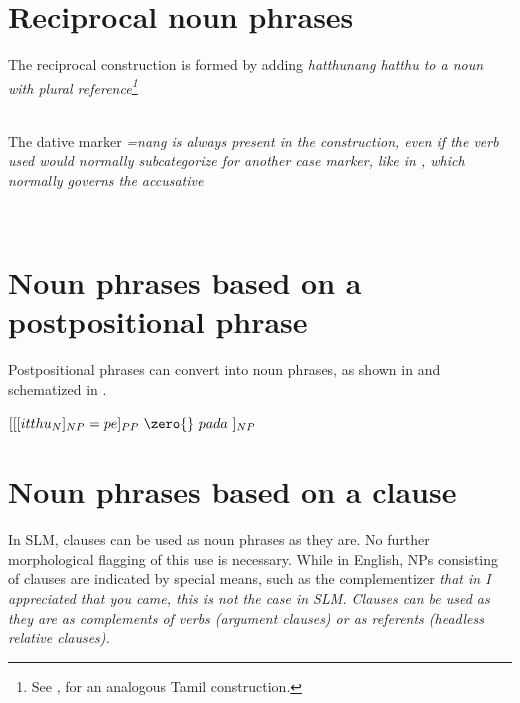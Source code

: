 \section{Reciprocal noun phrases}\label{sec:nppp:Reciprocalnounphrases}
The reciprocal construction is formed by adding \em hatthunang hatthu \em to a noun with plural reference\footnote{See \citet[177]{Beythan1943}, \citet[11]{Malten1989} for an analogous Tamil construction.}

 \\
The dative marker \em =nang \em is always present in the construction, even if the verb used would normally subcategorize for another case marker, like  in , which normally governs the accusative

 \\

\section{Noun phrases based on a postpositional phrase}\label{sec:nppp:Nounphrasesbasedonapostpositionalphrase}
Postpositional phrases can convert into noun phrases, as shown in  and schematized in .


\ea\label{ex:constr:NP:PP:schema}
$
[
	[
		[itthu_{N}]_{NP}
	=pe]_{PP}
~\zero{}~ pada~]_{NP}
$
\z


\section{Noun phrases based on a clause}\label{sec:nppp:Nounphrasesbasedonaclause}
In SLM, clauses can be used as noun phrases as they are. No further morphological flagging of this use is necessary. While in English, NPs consisting of clauses are indicated by special means, such as the complementizer \em that \em in \em I appreciated that you came\em, this is not the case in SLM. Clauses can be used as they are as complements of verbs (argument clauses) or as referents (headless relative clauses).


